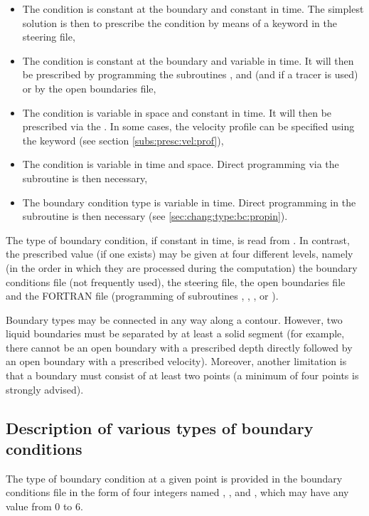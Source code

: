 \begin{itemize}
\item The condition is constant at the boundary and constant in time.
The simplest solution is then to prescribe the condition by means of a keyword
in the steering file,

\item The condition is constant at the boundary and variable in time.
It will then be prescribed by programming the subroutines ,
 and  (and 
if a tracer is used) or by the open boundaries file,

\item The condition is variable in space and constant in time.
It will then be prescribed via the .
In some cases, the velocity profile can be specified using the keyword
 (see section \ref{subs:presc:vel:prof}),

\item The condition is variable in time and space.
Direct programming via the  subroutine is then necessary,

\item The boundary condition type is variable in time.
Direct programming in the  subroutine is then
necessary (see \ref{sec:chang:type:bc:propin}).
\end{itemize}

The type of boundary condition, if constant in time, is read from
.
In contrast, the prescribed value (if one exists) may be given at four different
levels, namely (in the order in which they are processed during the computation)
the boundary conditions file (not frequently used), the steering file,
the open boundaries file and the FORTRAN file (programming of subroutines
, , , 
or ).

Boundary types may be connected in any way along a contour.
However, two liquid boundaries must be separated by at least a solid segment
(for example, there cannot be an open boundary with a prescribed depth directly
followed by an open boundary with a prescribed velocity).
Moreover, another limitation is that a boundary must consist of at least two
points (a minimum of four points is strongly advised).


\subsection{Description of various types of boundary conditions}
\label{subs:desc:bc}
The type of boundary condition at a given point is provided in the
boundary conditions file in the form of four integers named
, ,  and ,
which may have any value from 0 to 6.

